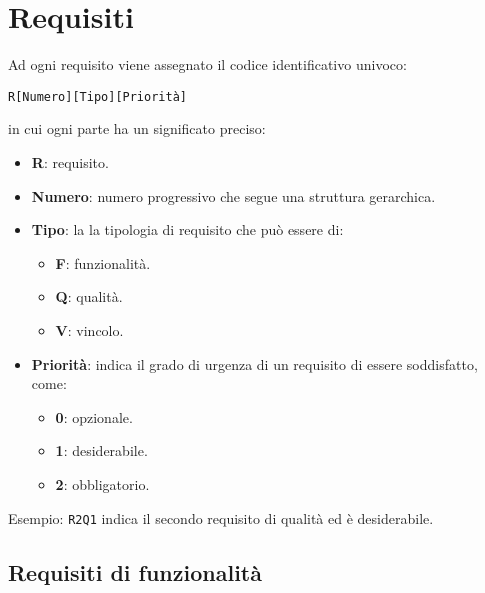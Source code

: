 


\section{Requisiti}
Ad ogni requisito viene assegnato il codice identificativo univoco:
	\begin{center}
		\texttt{R[Numero][Tipo][Priorità]}
	\end{center}
	in cui ogni parte ha un significato preciso:
	\begin{itemize}
		\item \textbf{R}: requisito.
		\item \textbf{Numero}: numero progressivo che segue una struttura gerarchica.
		\item \textbf{Tipo}: la la tipologia di requisito che può essere di:
		\begin{itemize}
			\item \textbf{F}: funzionalità.
			\item \textbf{Q}: qualità.
			\item \textbf{V}: vincolo.
		\end{itemize}
		\item \textbf{Priorità}: indica il grado di urgenza di un requisito di essere soddisfatto, come:
		\begin{itemize}
			\item \textbf{0}: opzionale.
			\item \textbf{1}: desiderabile.
			\item \textbf{2}: obbligatorio.
		\end{itemize}
	\end{itemize}


	Esempio: \texttt{R2Q1} indica il secondo requisito di qualità ed è desiderabile.





	\subsection{Requisiti di funzionalità}\label{RequisitiFunzionalità}

